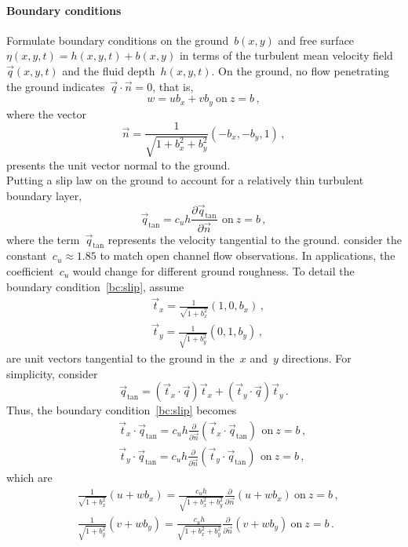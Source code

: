 \documentclass[12pt,a5paper]{article}
\begin{document}
\paragraph{Boundary conditions} Formulate boundary conditions on the ground~$b(x,y)$ and free surface~$\eta(x,y,t)=h(x,y,t)+b(x,y)$ in terms of the turbulent mean velocity field~$\vec q(x,y,t)$ and the fluid depth~$h(x,y,t)$. On the ground, no flow penetrating the ground indicates~$\vec q\cdot\vec n=0$, that is,
\begin{equation}
w=ub_x+vb_y\ \text{on}\ z=b\,,
\label{eq:nopen}
\end{equation}
where the vector
\begin{equation}
\vec n=\frac{1}{\sqrt{1+b_x^2+b_y^2}}(-b_x,-b_y,1)\,,\label{eq:vecn}
\end{equation} 
presents the unit vector normal to the ground.  
\\
Putting a slip law on the ground to account for a relatively thin turbulent boundary layer, 
\begin{equation}
\vec q_{\text{tan}}=c_uh\frac{\partial\vec q_{\text{tan}}}{\partial\vec n}\,\ \text{on}\ z=b\,,
\label{bc:slip}
\end{equation} 
where the term~$\vec q_{\text{tan}}$ represents the velocity tangential to the ground. \cite{Roberts2008} consider the constant~$c_u\approx1.85$ to match open channel flow observations. In applications, the coefficient~$c_u$ would change for different ground roughness. To detail the boundary condition~\eqref{bc:slip}, assume
\begin{align*}&
\vec t_x=\frac{1}{\sqrt{1+b_x^2}}(1,0,b_x)\,,
\\&
\vec t_y=\frac{1}{\sqrt{1+b_y^2}}(0,1,b_y)\,,
\end{align*}
are unit vectors tangential to the ground in the~$x$ and~$y$ directions. For simplicity, consider
\begin{equation*}
\vec q_{\text{tan}}=(\vec t_x\cdot\vec q)\vec t_x+(\vec t_y\cdot\vec q)\vec t_y\,.
\end{equation*}
Thus, the boundary condition~\eqref{bc:slip} becomes
\begin{eqnarray*}
&&\vec t_x\cdot\vec q_{\text{tan}}=c_uh\frac{\partial}{\partial\vec n}(\vec t_x\cdot\vec q_{\text{tan}})\,\ \text{on}\ z=b\,,\\
&&\vec t_y\cdot\vec q_{\text{tan}}=c_uh\frac{\partial}{\partial\vec n}(\vec t_y\cdot\vec q_{\text{tan}})\,\ \text{on}\ z=b\,,
\end{eqnarray*}
which are
\begin{align}&
\frac{1}{\sqrt{1+b_x^2}}(u+wb_x)=\frac{c_uh}{\sqrt{1+b_x^2+b_y^2}}\frac{\partial}{\partial\vec n}(u+wb_x)\ \text{on}\ z=b\,,\label{slip:u}\\&
\frac{1}{\sqrt{1+b_y^2}}(v+wb_y)=\frac{c_uh}{\sqrt{1+b_x^2+b_y^2}}\frac{\partial}{\partial\vec n}(v+wb_y)\ \text{on}\ z=b\,.\label{slip:v}
\end{align}
\end{document}
